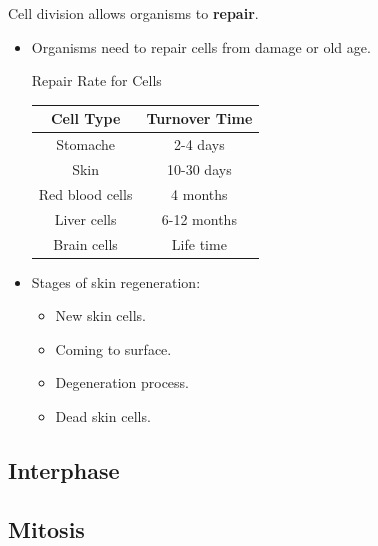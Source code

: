 \documentclass[12pt]{report}
\begin{document}
Cell division allows organisms to \textbf{repair}.
\begin{itemize}
    \item{Organisms need to repair cells from damage or old age.}
    \begin{table}[h!] %
    
        \renewcommand{\arraystretch}{1.5} %
        \setlength{\tabcolsep}{10pt} %
        \setlength{\arrayrulewidth}{0.25mm}
    
        \begin{center}
            Repair Rate for Cells \\
            \vspace{0.5em}
            \begin{tabular}{|c|c|} %
            \hline
            Cell Type & Turnover Time \\ %
            \hline
            Stomache &  2-4 days\\ %
            \hline
            Skin & 10-30 days\\ 
            \hline
            Red blood cells & 4 months \\ 
            \hline 
            Liver cells & 6-12 months\\ 
            \hline 
            Brain cells & Life time\\ 
            \hline
            \end{tabular}
        \end{center}
    \end{table}

    \item{Stages of skin regeneration:}
        \begin{itemize}
            \item{New skin cells.}
            \item{Coming to surface.}
            \item{Degeneration process.}
            \item{Dead skin cells.}
        \end{itemize}
\end{itemize}

\subsection{Interphase}

\subsection{Mitosis}\label{sec:mitosis}
\end{document}
